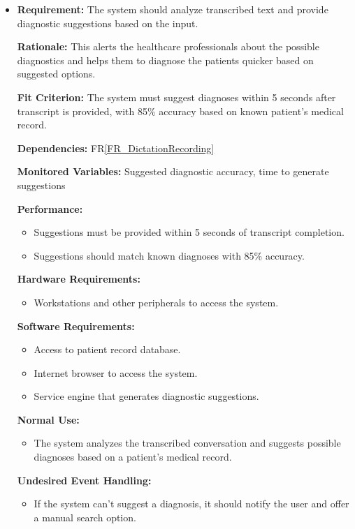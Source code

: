 \documentclass[12pt]{article}
\newcounter{reqnum} %
\begin{document}
\begin{itemize}
\item[FR\refstepcounter{reqnum}\thereqnum \label{FR_DiagnosticSuggestions}:]

\textbf{Requirement:} The system should analyze transcribed text and provide diagnostic suggestions based on the input.
    
\textbf{Rationale:} This alerts the healthcare professionals about the possible diagnostics and helps them to diagnose the patients quicker based on suggested options.
    
\textbf{Fit Criterion:} The system must suggest diagnoses within 5 seconds after transcript is provided, with 85\% accuracy based on known patient's medical record.
    
\textbf{Dependencies:} FR\ref{FR_DictationRecording}
    
\textbf{Monitored Variables:} Suggested diagnostic accuracy, time to generate suggestions 
  
\textbf{Performance:}
  \begin{itemize}
    \item Suggestions must be provided within 5 seconds of transcript completion. 
    \item Suggestions should match known diagnoses with 85\% accuracy. 
  \end{itemize}
    
\textbf{Hardware Requirements:}
  \begin{itemize}
    \item Workstations and other peripherals to access the system. 
  \end{itemize}
    
\textbf{Software Requirements:}
  \begin{itemize}
    \item Access to patient record database. 
    \item Internet browser to access the system.  
    \item Service engine that generates diagnostic suggestions. 
  \end{itemize}
    
\textbf{Normal Use:} 
  \begin{itemize}
    \item The system analyzes the transcribed conversation and suggests possible diagnoses based on a patient's medical record. 
  \end{itemize}
    
\textbf{Undesired Event Handling:} 
  \begin{itemize}
    \item If the system can't suggest a diagnosis, it should notify the user and offer a manual search option. 
  \end{itemize}



\end{itemize}
\end{document}
